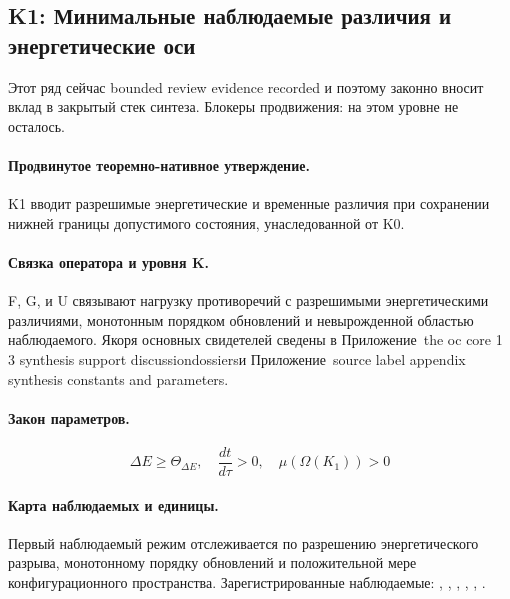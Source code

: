 \subsection{K1: Минимальные наблюдаемые различия и энергетические оси}
\label{sec:oc-core-1-3-synthesis-k1}
Этот ряд сейчас bounded review evidence recorded и поэтому законно вносит вклад в закрытый стек синтеза.
Блокеры продвижения: на этом уровне не осталось.

\paragraph{Продвинутое теоремно-нативное утверждение.}
K1 вводит разрешимые энергетические и временные различия при сохранении нижней границы допустимого состояния, унаследованной от K0.

\paragraph{Связка оператора и уровня K.}
F, G, и U связывают нагрузку противоречий с разрешимыми энергетическими различиями, монотонным порядком обновлений и невырожденной областью наблюдаемого.
Якоря основных свидетелей сведены в Приложение~the oc core 1 3 synthesis support discussiondossiersи Приложение~source label appendix synthesis constants and parameters.

\paragraph{Закон параметров.}
\[
\Delta E \geq \Theta_{\Delta E},\quad \frac{dt}{d\tau} > 0,\quad \mu(\Omega(K_1)) > 0
\]

\paragraph{Карта наблюдаемых и единицы.}
Первый наблюдаемый режим отслеживается по разрешению энергетического разрыва, монотонному порядку обновлений и положительной мере конфигурационного пространства.
Зарегистрированные наблюдаемые: , \allowbreak {}, \allowbreak {}, \allowbreak {}, \allowbreak {}, \allowbreak {}.

